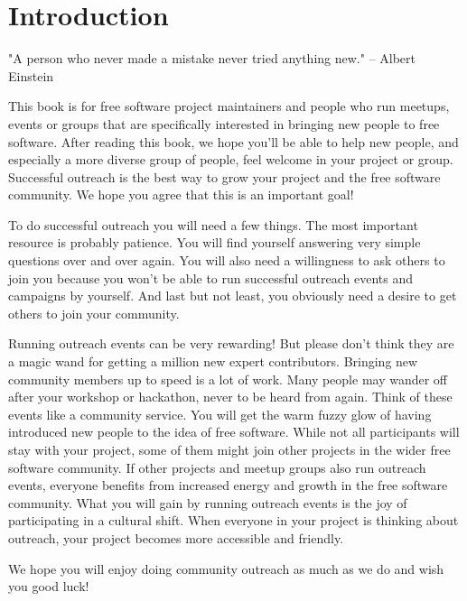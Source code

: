 \chapter{Introduction}

"A person who never made a mistake never tried anything new." -- Albert Einstein 

This book is for free software project maintainers and people who run meetups, events or groups that are specifically interested in bringing new people to free software. After reading this book, we hope you’ll be able to help new people, and especially a more diverse group of people, feel welcome in your project or group. Successful outreach is the best way to grow your project and the free software community. We hope you agree that this is an important goal! 

To do successful outreach you will need a few things. The most important resource is probably patience. You will find yourself answering very simple questions over and over again. You will also need a willingness to ask others to join you because you won’t be able to run successful outreach events and campaigns by yourself. And last but not least, you obviously need a desire to get others to join your community.

Running outreach events can be very rewarding! But please don’t think they are a magic wand for getting a million new expert contributors. Bringing new community members up to speed is a lot of work. Many people may wander off after your workshop or hackathon, never to be heard from again. Think of these events like a community service. You will get the warm fuzzy glow of having introduced new people to the idea of free software. While not all participants will stay with your project, some of them might join other projects in the wider free software community. If other projects and meetup groups also run outreach events, everyone benefits from increased energy and growth in the free software community. What you will gain by running outreach events is the joy of participating in a cultural shift. When everyone in your project is thinking about outreach, your project becomes more accessible and friendly.

We hope you will enjoy doing community outreach as much as we do and wish you good luck!

\bookauthors {}